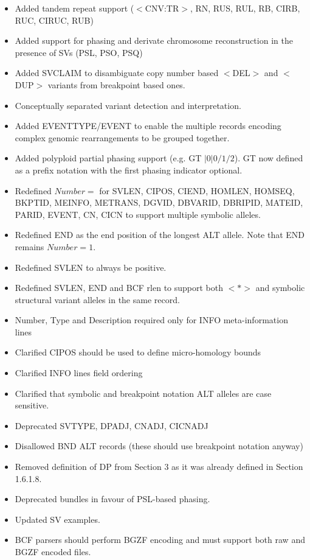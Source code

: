 \documentclass[8pt]{article}
\begin{document}
\begin{itemize}
\item Added tandem repeat support ($<$CNV:TR$>$, RN, RUS, RUL, RB, CIRB, RUC, CIRUC, RUB)
\item Added support for phasing and derivate chromosome reconstruction in the presence of SVs (PSL, PSO, PSQ)
\item Added SVCLAIM to disambiguate copy number based $<$DEL$>$ and $<$DUP$>$ variants from breakpoint based ones.
\item Conceptually separated variant detection and interpretation.
\item Added EVENTTYPE/EVENT to enable the multiple records encoding complex genomic rearrangements to be grouped together.
\item Added polyploid partial phasing support (e.g. GT $|0|0/1/2$). GT now defined as a prefix notation with the first phasing indicator optional.
\item Redefined $Number=$ for SVLEN, CIPOS, CIEND, HOMLEN, HOMSEQ, BKPTID, MEINFO, METRANS, DGVID, DBVARID, DBRIPID, MATEID, PARID, EVENT, CN, CICN to support multiple symbolic alleles.
\item Redefined END as the end position of the longest ALT allele. Note that END remains $Number=1$.
\item Redefined SVLEN to always be positive.
\item Redefined SVLEN, END and BCF rlen to support both $<*>$ and symbolic structural variant alleles in the same record.
\item Number, Type and Description required only for INFO meta-information lines
\item Clarified CIPOS should be used to define micro-homology bounds
\item Clarified INFO lines field ordering
\item Clarified that symbolic and breakpoint notation ALT alleles are case sensitive.
\item Deprecated SVTYPE, DPADJ, CNADJ, CICNADJ
\item Disallowed BND ALT records (these should use breakpoint notation anyway)
\item Removed definition of DP from Section 3 as it was already defined in Section 1.6.1.8.
\item Deprecated bundles in favour of PSL-based phasing.
\item Updated SV examples.
\item BCF parsers should perform BGZF encoding and must support both raw and BGZF encoded files.
\end{itemize}
\end{document}
